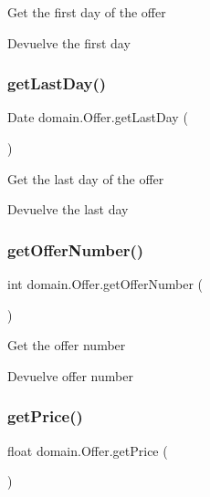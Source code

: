 Get the first day of the offer

\begin{DoxyReturn}{Devuelve}
the first day 
\end{DoxyReturn}
\mbox{\label{classdomain_1_1_offer_a8bf48365a8fc185dbdcaac80a9d84444}} 
\subsubsection{\texorpdfstring{getLastDay()}{getLastDay()}}
{\footnotesize\ttfamily Date domain.\+Offer.\+get\+Last\+Day (\begin{DoxyParamCaption}{ }\end{DoxyParamCaption})}

Get the last day of the offer

\begin{DoxyReturn}{Devuelve}
the last day 
\end{DoxyReturn}
\mbox{\label{classdomain_1_1_offer_ab9e27c474ec6819a27eac1847d876c3a}} 
\subsubsection{\texorpdfstring{getOfferNumber()}{getOfferNumber()}}
{\footnotesize\ttfamily int domain.\+Offer.\+get\+Offer\+Number (\begin{DoxyParamCaption}{ }\end{DoxyParamCaption})}

Get the offer number

\begin{DoxyReturn}{Devuelve}
offer number 
\end{DoxyReturn}
\mbox{\label{classdomain_1_1_offer_a4ebf9c6f415709b527e006fdffa3a0c3}} 
\subsubsection{\texorpdfstring{getPrice()}{getPrice()}}
{\footnotesize\ttfamily float domain.\+Offer.\+get\+Price (\begin{DoxyParamCaption}{ }\end{DoxyParamCaption})}

